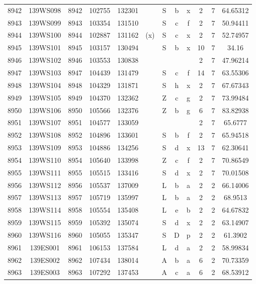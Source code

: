 \begin{tabular}{|*{12}{c|}}
8942 & 139WS098 & 8942 & 102755 & 132301 &  & S & b & x & 2 & 7 & 64.65312 \\ 
8943 & 139WS099 & 8943 & 103354 & 131510 &  & S & c & f & 2 & 7 & 50.94411 \\ 
8944 & 139WS100 & 8944 & 102887 & 131162 & (x) & S & c & x & 2 & 7 & 52.74957 \\ 
8945 & 139WS101 & 8945 & 103157 & 130494 &  & S & b & x & 10 & 7 & 34.16 \\ 
8946 & 139WS102 & 8946 & 103553 & 130838 &  &  &  &  & 2 & 7 & 47.96214 \\ 
8947 & 139WS103 & 8947 & 104439 & 131479 &  & S & c & f & 14 & 7 & 63.55306 \\ 
8948 & 139WS104 & 8948 & 104329 & 131871 &  & S & h & x & 2 & 7 & 67.67343 \\ 
8949 & 139WS105 & 8949 & 104370 & 132362 &  & Z & c & g & 2 & 7 & 73.99484 \\ 
8950 & 139WS106 & 8950 & 105566 & 132376 &  & Z & b & g & 6 & 7 & 83.82938 \\ 
8951 & 139WS107 & 8951 & 104577 & 133059 &  &  &  &  & 2 & 7 & 65.6777 \\ 
8952 & 139WS108 & 8952 & 104896 & 133601 &  & S & b & f & 2 & 7 & 65.94518 \\ 
8953 & 139WS109 & 8953 & 104886 & 134256 &  & S & d & x & 13 & 7 & 62.30641 \\ 
8954 & 139WS110 & 8954 & 105640 & 133998 &  & Z & c & f & 2 & 7 & 70.86549 \\ 
8955 & 139WS111 & 8955 & 105515 & 133416 &  & S & d & x & 2 & 7 & 70.01508 \\ 
8956 & 139WS112 & 8956 & 105537 & 137009 &  & L & b & a & 2 & 2 & 66.14006 \\ 
8957 & 139WS113 & 8957 & 105719 & 135997 &  & L & b & a & 2 & 2 & 68.9513 \\ 
8958 & 139WS114 & 8958 & 105554 & 135408 &  & L & e & b & 2 & 2 & 64.67832 \\ 
8959 & 139WS115 & 8959 & 105392 & 135074 &  & S & d & x & 2 & 2 & 63.14907 \\ 
8960 & 139WS116 & 8960 & 105055 & 135347 &  & S & D & p & 2 & 2 & 61.3902 \\ 
8961 & 139ES001 & 8961 & 106153 & 137584 &  & L & d & a & 2 & 2 & 58.99834 \\ 
8962 & 139ES002 & 8962 & 107434 & 138014 &  & A & b & a & 6 & 2 & 70.73359 \\ 
8963 & 139ES003 & 8963 & 107292 & 137453 &  & A & c & a & 6 & 2 & 68.53912 \\ 

\end{tabular}
